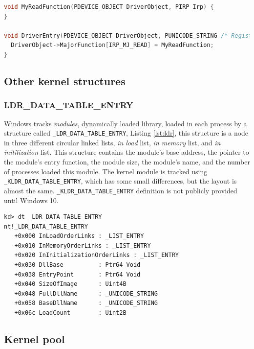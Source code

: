 \begin{lstlisting}[language=cpp,label={lst:majorfunc},caption=\texttt{Seting MajorFunction} in kernel-mode driver,float,floatplacement=H]
void MyReadFunction(PDEVICE_OBJECT DriverObject, PIRP Irp) {
}

void DriverEntry(PDEVICE_OBJECT DriverObject, PUNICODE_STRING /* RegistryPath */) {
  DriverObject->MajorFunction[IRP_MJ_READ] = MyReadFunction;
}
\end{lstlisting}

\subsection[Other kernel structures]{Other kernel structures}

\subsubsection[LDR\_DATA\_TABLE\_ENTRY]{LDR\_DATA\_TABLE\_ENTRY}

Windows tracks \textit{modules}, dynamically loaded library, loaded in each
process by a structure called \texttt{\_LDR\_DATA\_TABLE\_ENTRY}, Listing
\ref{lst:ldr}, this structure is a node in three different circular linked
lists, \textit{in load} list, \textit{in memory} list, and \textit{in
  initilization} list. This structure contains the module's base address, the
pointer to the module's entry function, the module size, the module's name, and
the number of processes loaded this module. The kernel module is tracked using
\texttt{\_KLDR\_DATA\_TABLE\_ENTRY}, which has some small differences, but the
layout is almost the same. \texttt{\_KLDR\_DATA\_TABLE\_ENTRY} definition is
not publicly provided until Windows 10.

\begin{lstlisting}[language=windbg,label={lst:ldr},caption=\texttt{\_LDR\_DATA\_TABLE\_ENTRY} in Windows 7,float,floatplacement=H]
kd> dt _LDR_DATA_TABLE_ENTRY
nt!_LDR_DATA_TABLE_ENTRY
   +0x000 InLoadOrderLinks : _LIST_ENTRY
   +0x010 InMemoryOrderLinks : _LIST_ENTRY
   +0x020 InInitializationOrderLinks : _LIST_ENTRY
   +0x030 DllBase          : Ptr64 Void
   +0x038 EntryPoint       : Ptr64 Void
   +0x040 SizeOfImage      : Uint4B
   +0x048 FullDllName      : _UNICODE_STRING
   +0x058 BaseDllName      : _UNICODE_STRING
   +0x06c LoadCount        : Uint2B
\end{lstlisting}

\subsection[Kernel pool]{Kernel pool}
\label{sec:pool}


